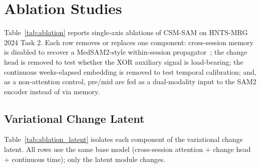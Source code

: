 \section{Ablation Studies}
\label{sec:ablations}

Table~\ref{tab:ablation} reports single-axis ablations of CSM-SAM on
HNTS-MRG 2024 Task 2. Each row removes or replaces one component:
cross-session memory is disabled to recover a MedSAM2-style
within-session propagator~\cite{ma2024medsam2}; the change head is
removed to test whether the XOR auxiliary signal is load-bearing; the
continuous weeks-elapsed embedding is removed to test temporal
calibration; and, as a non-attention control, pre/mid are fed as a
dual-modality input to the SAM2 encoder instead of via memory.


\subsection{Variational Change Latent}
\label{sec:ablations:latent}

Table~\ref{tab:ablation_latent} isolates each component of the variational
change latent.  All rows use the same base model (cross-session attention +
change head + continuous time); only the latent module changes.

\begin{table}[h]
\centering
\caption{Ablation of the variational change latent on HNTS-MRG Task~2.
The Spearman $\rho$ column tests the emergent phenotype claim without any
$\Delta V$ supervision in training.}
\label{tab:ablation_latent}
\end{table}

